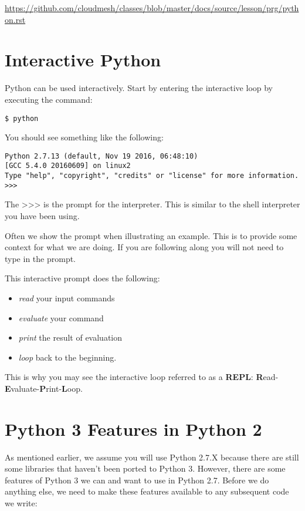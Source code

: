 \begin{fileremark}\url{https://github.com/cloudmesh/classes/blob/master/docs/source/lesson/prg/python.rst}\end{fileremark}
\section{Interactive Python}\label{interactive-python}

Python can be used interactively. Start by entering the interactive loop
by executing the command:

\begin{verbatim}
$ python
\end{verbatim}

You should see something like the following:

\begin{verbatim}
Python 2.7.13 (default, Nov 19 2016, 06:48:10)
[GCC 5.4.0 20160609] on linux2
Type "help", "copyright", "credits" or "license" for more information.
>>>
\end{verbatim}

The \textgreater{}\textgreater{}\textgreater{} is the prompt for the
interpreter. This is similar to the shell interpreter you have been
using.

Often we show the prompt when illustrating an example. This is to
provide some context for what we are doing. If you are following along
you will not need to type in the prompt.

This interactive prompt does the following:

\begin{itemize}
\tightlist
\item
  \emph{read} your input commands
\item
  \emph{evaluate} your command
\item
  \emph{print} the result of evaluation
\item
  \emph{loop} back to the beginning.
\end{itemize}

This is why you may see the interactive loop referred to as a
\textbf{REPL}:
\textbf{R}ead-\textbf{E}valuate-\textbf{P}rint-\textbf{L}oop.

\section{Python 3 Features in Python
2}\label{python-3-features-in-python-2}

As mentioned earlier, we assume you will use Python 2.7.X because there
are still some libraries that haven't been ported to Python 3. However,
there are some features of Python 3 we can and want to use in Python
2.7. Before we do anything else, we need to make these features
available to any subsequent code we write:

